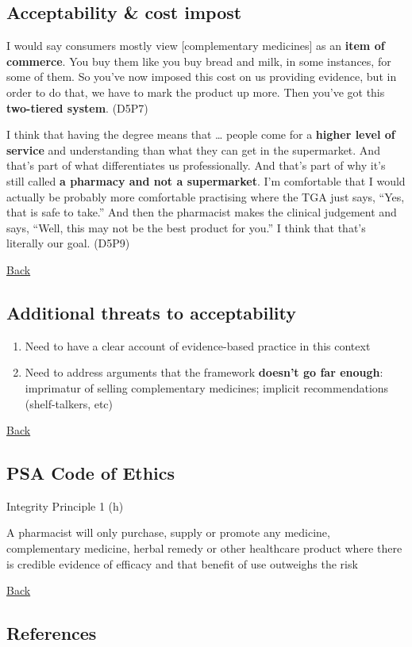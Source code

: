 \documentclass[]{article}
\begin{document}
\subsection{Acceptability \& cost
impost}\label{acceptability-cost-impost}

I would say consumers mostly view {[}complementary medicines{]} as an
\textbf{item of commerce}. You buy them like you buy bread and milk, in
some instances, for some of them. So you've now imposed this cost on us
providing evidence, but in order to do that, we have to mark the product
up more. Then you've got this \textbf{two-tiered system}. (D5P7)

I think that having the degree means that \ldots{} people come for a
\textbf{higher level of service} and understanding than what they can
get in the supermarket. And that's part of what differentiates us
professionally. And that's part of why it's still called \textbf{a
pharmacy and not a supermarket}. I'm comfortable that I would actually
be probably more comfortable practising where the TGA just says, ``Yes,
that is safe to take.'' And then the pharmacist makes the clinical
judgement and says, ``Well, this may not be the best product for you.''
I think that that's literally our goal. (D5P9)

\protect\hyperlink{ux2fthanks-questions}{Back}

\subsection{Additional threats to
acceptability}\label{additional-threats-to-acceptability}

\begin{enumerate}
\def\labelenumi{\arabic{enumi}.}
\item
  Need to have a clear account of evidence-based practice in this
  context
\item
  Need to address arguments that the framework \textbf{doesn't go far
  enough}: imprimatur of selling complementary medicines; implicit
  recommendations (shelf-talkers, etc)
\end{enumerate}

\protect\hyperlink{ux2fthanks-questions}{Back}

\subsection{PSA Code of Ethics}\label{psa-code-of-ethics}

Integrity Principle 1 (h)

A pharmacist will only purchase, supply or promote any medicine,
complementary medicine, herbal remedy or other healthcare product where
there is credible evidence of efficacy and that benefit of use outweighs
the risk

\protect\hyperlink{ux2fthanks-questions}{Back}

\subsection{References}\label{references}

\printbibliography[heading=none]
\end{document}
